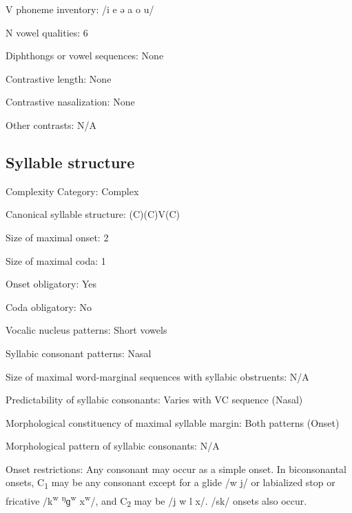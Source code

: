 {\begin{appendixdesc}
\item[V phoneme inventory:] /i e ə a o u/

\item[N vowel qualities:] 6

\item[Diphthongs or vowel sequences:] None

\item[Contrastive length:] None

\item[Contrastive nasalization:] None

\item[Other contrasts:] N/A
\end{appendixdesc}
\subsection*{Syllable structure}
\begin{appendixdesc}

\item[Complexity Category:] Complex

\item[Canonical syllable structure:] (C)(C)V(C) \citep[63--73]{Loughnane2009}

\item[Size of maximal onset:] 2

\item[Size of maximal coda:] 1

\item[Onset obligatory:] Yes

\item[Coda obligatory:] No

\item[Vocalic nucleus patterns:] Short vowels

\item[Syllabic consonant patterns:] Nasal

\item[Size of maximal word-marginal sequences with syllabic obstruents:] N/A

\item[Predictability of syllabic consonants:] Varies with VC sequence (Nasal)

\item[Morphological constituency of maximal syllable margin:] Both patterns (Onset)

\item[Morphological pattern of syllabic consonants:] N/A

\item[Onset restrictions:] Any consonant may occur as a simple onset. In biconsonantal onsets, C\textsubscript{1} may be any consonant except for a glide /w j/ or labialized stop or fricative /k\textsuperscript{w} \textsuperscript{ŋ}ɡ\textsuperscript{w} x\textsuperscript{w}/, and C\textsubscript{2} may be /j w l x/. /sk/ onsets also occur.


\end{appendixdesc}}
